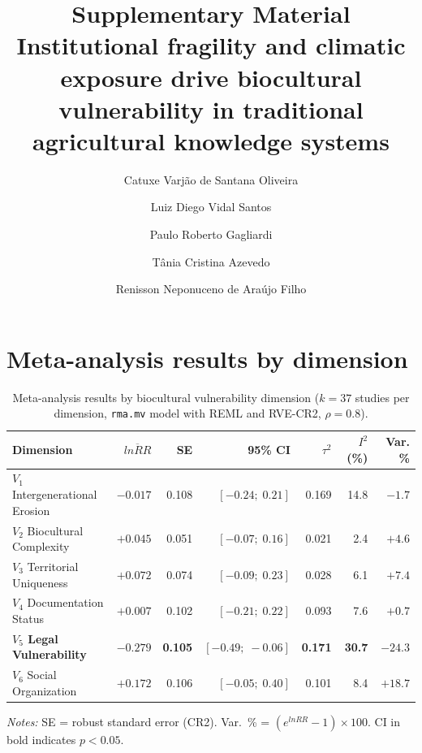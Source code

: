 \documentclass[12pt,a4paper]{article}
\begin{document}
\title{Supplementary Material\\[0.5em]
\large Institutional fragility and climatic exposure drive biocultural vulnerability in traditional agricultural knowledge systems}

\author{Catuxe Varj\~ao de Santana Oliveira \and Luiz Diego Vidal Santos \and Paulo Roberto Gagliardi \and T\^ania Cristina Azevedo \and Renisson Neponuceno de Ara\'ujo Filho}

\date{}
\maketitle

\tableofcontents
\newpage

\section{Meta-analysis results by dimension}
\label{app:tabela}

\begin{table}[H]
\caption{Meta-analysis results by biocultural vulnerability dimension ($k = 37$ studies per dimension, \texttt{rma.mv} model with REML and RVE-CR2, $\rho = 0.8$).}
\label{tab:meta-results}
\centering
\small
\begin{tabular}{lrrrrrr}
\toprule
\textbf{Dimension} & $\overline{lnRR}$ & \textbf{SE} & \textbf{95\% CI} & $\tau^2$ & $I^2$ (\%) & \textbf{Var. \%} \\
\midrule
$V_1$ Intergenerational Erosion    & $-0.017$ & 0.108 & $[-0.24;\; 0.21]$ & 0.169 & 14.8 & $-1.7$ \\
$V_2$ Biocultural Complexity       & $+0.045$ & 0.051 & $[-0.07;\; 0.16]$ & 0.021 &  2.4 & $+4.6$ \\
$V_3$ Territorial Uniqueness       & $+0.072$ & 0.074 & $[-0.09;\; 0.23]$ & 0.028 &  6.1 & $+7.4$ \\
$V_4$ Documentation Status         & $+0.007$ & 0.102 & $[-0.21;\; 0.22]$ & 0.093 &  7.6 & $+0.7$ \\
\textbf{$V_5$ Legal Vulnerability} & $\mathbf{-0.279}$ & \textbf{0.105} & $\mathbf{[-0.49;\; -0.06]}$ & \textbf{0.171} & \textbf{30.7} & $\mathbf{-24.3}$ \\
$V_6$ Social Organization          & $+0.172$ & 0.106 & $[-0.05;\; 0.40]$ & 0.101 &  8.4 & $+18.7$ \\
\bottomrule
\end{tabular}
\begin{flushleft}
\footnotesize \textit{Notes:} SE = robust standard error (CR2). Var.~\% = $(e^{lnRR} - 1) \times 100$.  CI in bold indicates $p < 0.05$.
\end{flushleft}
\end{table}
\end{document}
